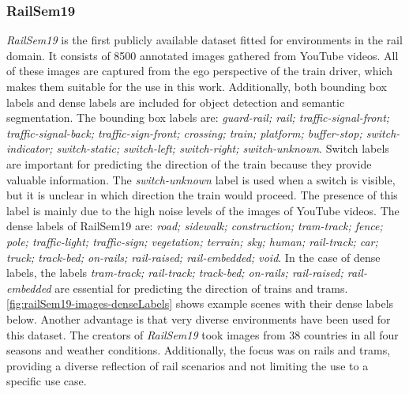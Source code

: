 
\subsubsection{RailSem19}
\textit{RailSem19} \cite{railsem19dataset} is the first publicly available dataset fitted for environments in the rail domain. It consists of 8500 annotated images gathered from YouTube videos. All of these images are captured from the ego perspective of the train driver, which makes them suitable for the use in this work. Additionally, both bounding box labels and dense labels are included for object detection and semantic segmentation. The bounding box labels are: \textit{guard-rail; rail; traffic-signal-front; traffic-signal-back; traffic-sign-front; crossing; train; platform; buffer-stop; switch-indicator; switch-static; switch-left; switch-right; switch-unknown}. Switch labels are important for predicting the direction of the train because they provide valuable information. The \textit{switch-unknown} label is used when a switch is visible, but it is unclear in which direction the train would proceed. The presence of this label is mainly due to the high noise levels of the images of YouTube videos.
The dense labels of RailSem19 are: \textit{road; sidewalk; construction; tram-track; fence; pole; traffic-light; traffic-sign; vegetation; terrain; sky; human; rail-track; car; truck; track-bed; on-rails; rail-raised; rail-embedded; void}. In the case of dense labels, the labels \textit{tram-track; rail-track; track-bed; on-rails; rail-raised; rail-embedded} are essential for predicting the direction of trains and trams. \autoref{fig:railSem19-images-denseLabels} shows example scenes with their dense labels below.
Another advantage is that very diverse environments have been used for this dataset. The creators of \textit{RailSem19} took images from 38 countries in all four seasons and weather conditions. Additionally, the focus was on rails and trams, providing a diverse reflection of rail scenarios and not limiting the use to a specific use case.

